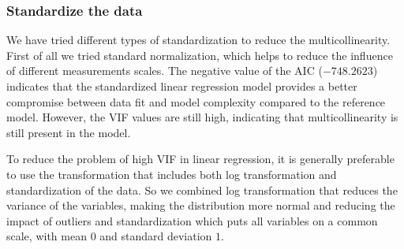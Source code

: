 \documentclass[
]{article}
\newenvironment{Shaded}{\begin{snugshade}}{\end{snugshade}}
\newcommand{\AttributeTok}[1]{\textcolor[rgb]{0.13,0.29,0.53}{#1}}
\newcommand{\CommentTok}[1]{\textcolor[rgb]{0.56,0.35,0.01}{\textit{#1}}}
\newcommand{\DecValTok}[1]{\textcolor[rgb]{0.00,0.00,0.81}{#1}}
\newcommand{\FunctionTok}[1]{\textcolor[rgb]{0.13,0.29,0.53}{\textbf{#1}}}
\newcommand{\NormalTok}[1]{#1}
\newcommand{\OtherTok}[1]{\textcolor[rgb]{0.56,0.35,0.01}{#1}}
\newcommand{\SpecialCharTok}[1]{\textcolor[rgb]{0.81,0.36,0.00}{\textbf{#1}}}
\newcommand{\StringTok}[1]{\textcolor[rgb]{0.31,0.60,0.02}{#1}}
\begin{document}
\subsubsection{Standardize the data}\label{standardize-the-data}

We have tried different types of standardization to reduce the
multicollinearity. First of all we tried standard normalization, which
helps to reduce the influence of different measurements scales. The
negative value of the AIC (\(-748.2623\)) indicates that the
standardized linear regression model provides a better compromise
between data fit and model complexity compared to the reference model.
However, the VIF values are still high, indicating that
multicollinearity is still present in the model.

To reduce the problem of high VIF in linear regression, it is generally
preferable to use the transformation that includes both log
transformation and standardization of the data. So we combined log
transformation that reduces the variance of the variables, making the
distribution more normal and reducing the impact of outliers and
standardization which puts all variables on a common scale, with mean
\(0\) and standard deviation \(1\).

\begin{Shaded}
\end{Shaded}
\end{document}
